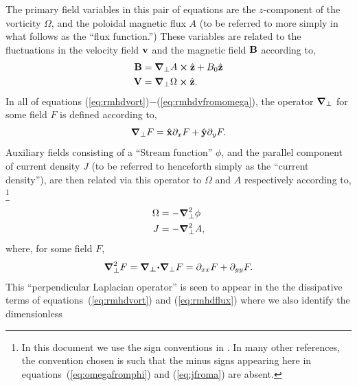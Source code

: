 \documentclass[12pt, letterpaper, oneside, leqno, openright]{memoir}
\begin{document}
%
The primary field variables in this pair of equations are the $z$-component
of the vorticity $\Omega$, and the poloidal magnetic flux $A$ (to be referred
to more simply in what follows as the ``flux function.'') These variables
are related to the fluctuations in the velocity field $\mathbf{v}$ and
the magnetic field $\mathbf{B}$ according to,
%
\begin{subequations}
\begin{align}
  \mathbf{B}        &= \boldsymbol{\nabla}_\perp A      \boldsymbol{\times} \hat{\mathbf{z}} + B_0\hat{\mathbf{z}} \label{eq:rmhdbfroma}      \\
  \mathbf{V}        &= \boldsymbol{\nabla}_\perp \Omega \boldsymbol{\times} \hat{\mathbf{z}}            \label{eq:rmhdvfromomega}.
\end{align}
\end{subequations}
%
In all of equations (\ref{eq:rmhdvort})$-$(\ref{eq:rmhdvfromomega}), the operator
$\boldsymbol{\nabla}_\perp$ for some field $F$ is defined according to,
%
\begin{subequations}
\begin{equation}
  \boldsymbol{\nabla}_\perp F=\hat{\mathbf{x}}\partial_x F + \hat{\mathbf{y}}\partial_y F \label{eq:defdelperp}.
\end{equation}
\end{subequations}
%
Auxiliary fields consisting of a ``Stream function'' $\phi$, and
the parallel component of current density $J$ (to be referred to 
henceforth simply as the ``current density''), are then related 
via this operator to $\Omega$ and $A$ respectively according to,
\footnote{In this document we use the sign conventions in 
\citet{Longcope93}. In many other references, the convention
chosen is such that the minus signs appearing here in
equations~(\ref{eq:omegafromphi}) and (\ref{eq:jfroma})
are absent.}
%
\begin{subequations}
\begin{align}
  \Omega &=-\boldsymbol{\nabla}_\perp^2\phi  \label{eq:omegafromphi} \\
  J      &=-\boldsymbol{\nabla}_\perp^2 A,     \label{eq:jfroma}
\end{align}
\end{subequations}
%
where, for some field $F$, 
%
\begin{subequations}
\begin{equation}
  \boldsymbol{\nabla}_\perp^2 F=\boldsymbol{\nabla_\perp\cdot}\boldsymbol{\nabla}_\perp F=\partial_{xx} F + \partial_{yy} F. \label{eq:defdelperpsqd}
\end{equation}
\end{subequations}
%
This ``perpendicular Laplacian operator'' is seen to appear in the
the dissipative terms of equations~(\ref{eq:rmhdvort}) and
(\ref{eq:rmhdflux})  where we also identify the dimensionless
\end{document}
